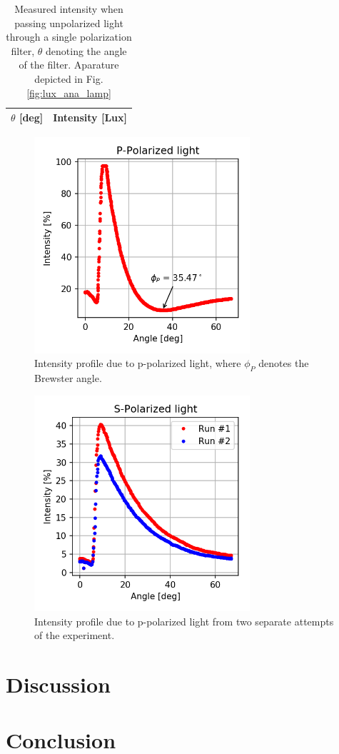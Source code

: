 \documentclass[11pt,a4paper]{article}
\begin{document}
  \begin{table}[H]
      \center
      \caption{Measured intensity when passing unpolarized light through a single polarization filter, $\theta$ denoting the angle of the filter. Aparature depicted in Fig. \ref{fig:lux_ana_lamp}}
       \begin{tabular}{r | l}
        $\theta$ [deg] & Intensity [Lux] \\ \hline
         
       \end{tabular}
       \label{tab:ana}
  \end{table}



  \begin{figure}[H]
    \center
    \includegraphics[width=8cm]{scripts/ppolar.png}
    \caption{Intensity profile due to p-polarized light, where $\phi_P$ denotes the Brewster angle.}
  \end{figure}

  \begin{figure}[H]
    \center
    \includegraphics[width=8cm]{scripts/spolar.png}
    \caption{Intensity profile due to p-polarized light from two separate attempts of the experiment.}
  \end{figure}

\section{\label{sect:discuss}Discussion}

\section{\label{sect:conclusion}Conclusion}





\end{document}
